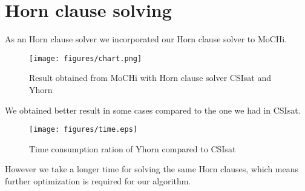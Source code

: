 \section{Horn clause solving}

As an Horn clause solver we incorporated our Horn clause solver to MoCHi.

\begin{figure}
\begin{center}
\texttt{[image: figures/chart.png]}
\end{center}
\caption{Result obtained from MoCHi with Horn clause solver CSIsat and
Yhorn}
\end{figure}

We obtained better result in some cases compared to the one we had in CSIsat.

\begin{figure}
\begin{center}
\texttt{[image: figures/time.eps]}
\end{center}
\caption{Time consumption ration of Yhorn compared to CSIsat}
\end{figure}

However we take a longer time for solving the same Horn clauses, which
means further optimization is required for our algorithm.
